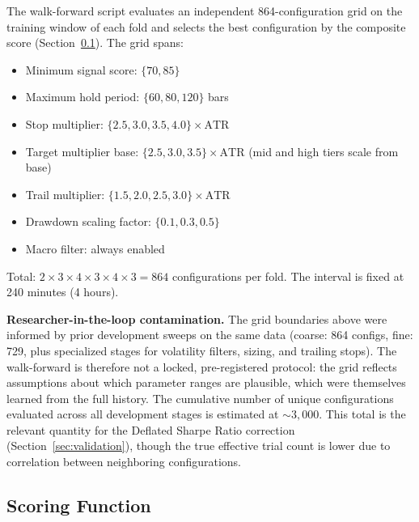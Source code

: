 \documentclass{article}
\begin{document}
The walk-forward script evaluates an independent 864-configuration grid on the training window of each fold and selects the best configuration by the composite score (Section~\ref{sec:walkforward_score}).
The grid spans:
\begin{itemize}[nosep]
  \item Minimum signal score: $\{70, 85\}$
  \item Maximum hold period: $\{60, 80, 120\}$ bars
  \item Stop multiplier: $\{2.5, 3.0, 3.5, 4.0\} \times \text{ATR}$
  \item Target multiplier base: $\{2.5, 3.0, 3.5\} \times \text{ATR}$ (mid and high tiers scale from base)
  \item Trail multiplier: $\{1.5, 2.0, 2.5, 3.0\} \times \text{ATR}$
  \item Drawdown scaling factor: $\{0.1, 0.3, 0.5\}$
  \item Macro filter: always enabled
\end{itemize}
Total: $2 \times 3 \times 4 \times 3 \times 4 \times 3 = 864$ configurations per fold.
The interval is fixed at 240 minutes (4 hours).

\textbf{Researcher-in-the-loop contamination.}
The grid boundaries above were informed by prior development sweeps on the same data (coarse: 864 configs, fine: 729, plus specialized stages for volatility filters, sizing, and trailing stops).
The walk-forward is therefore not a locked, pre-registered protocol: the grid reflects assumptions about which parameter ranges are plausible, which were themselves learned from the full history.
The cumulative number of unique configurations evaluated across all development stages is estimated at ${\sim}3{,}000$.
This total is the relevant quantity for the Deflated Sharpe Ratio correction (Section~\ref{sec:validation}), though the true effective trial count is lower due to correlation between neighboring configurations.

\subsection{Scoring Function}
\label{sec:walkforward_score}
\end{document}

